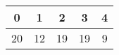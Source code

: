 \begin{tabular}{|c|c|c|c|c|}
    \hline
    \rule{0pt}{4ex} 0 & 1 & 2 & 3 & 4\\
    \hline
    20 & 12 & 19 & 19 & 9\\
    \hline
    [1ex]
\end{tabular}